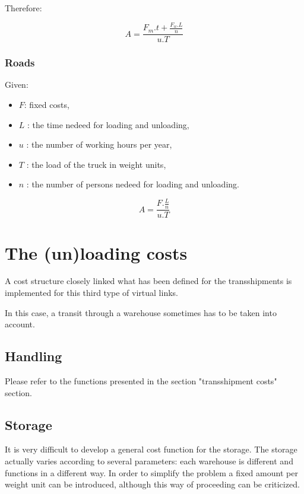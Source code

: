 Therefore:

$$A=\frac{F_m.t+\frac{F_w.L}{n}}{u.T}$$

\subsubsection{Roads}

Given:

\begin{itemize}
\item $F$: fixed costs,
\item $L$ : the time nedeed for loading and unloading,
\item $u$ : the number of working hours per year,
\item $T$ : the load of the truck in weight units,
\item $n$ : the number of persons nedeed for loading and unloading.
\end{itemize}

$$A=\frac{F.\frac{L}{n}}{u.T}$$



\section{The (un)loading costs }

A cost structure closely linked what has been defined for the transshipments
is implemented for this third type of virtual links.

In this case, a transit through a warehouse sometimes has to be taken into
account.



\subsection{Handling}

Please refer to the functions presented in the
section "transshipment costs" section.



\subsection{Storage}

It is very difficult to develop a general cost function for the storage.  The
storage actually varies according to several parameters: each warehouse is
different and functions in a different way.  In order to simplify the problem a
fixed amount per weight unit can be introduced, although this way of proceeding can be
criticized.



